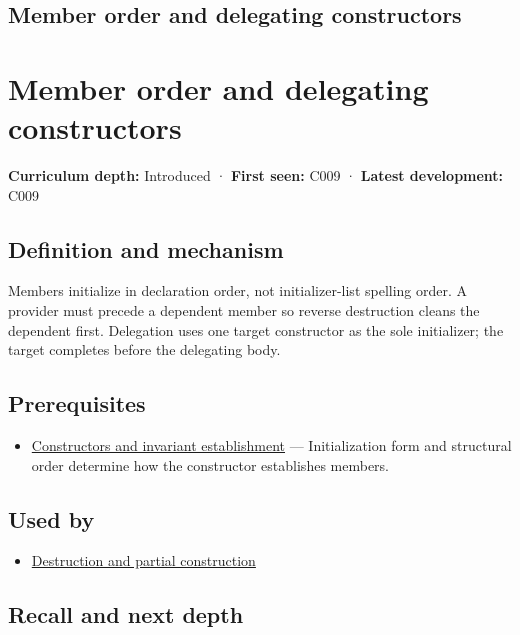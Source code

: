 \hypertarget{appendix-3cb49709605a}{}
\section*{Member order and delegating constructors}
\chapter{Member order and delegating constructors}\label{appendix-3cb49709605a-member-order-and-delegating-constructors}

\textbf{Curriculum depth:} Introduced · \textbf{First seen:} C009 · \textbf{Latest development:} C009

\section{Definition and mechanism}\label{appendix-3cb49709605a-definition-and-mechanism}

Members initialize in declaration order, not initializer-list spelling order. A provider must precede a dependent member so reverse destruction cleans the dependent first. Delegation uses one target constructor as the sole initializer; the target completes before the delegating body.

\section{Prerequisites}\label{appendix-3cb49709605a-prerequisites}

\begin{itemize}
\tightlist
\item
  \hyperref[appendix-7f8ec83d0886]{Constructors and invariant establishment} --- Initialization form and structural order determine how the constructor establishes members.
\end{itemize}

\section{Used by}\label{appendix-3cb49709605a-used-by}

\begin{itemize}
\tightlist
\item
  \hyperref[appendix-9bfe377cef7a]{Destruction and partial construction}
\end{itemize}

\section{Recall and next depth}\label{appendix-3cb49709605a-recall-and-next-depth}

